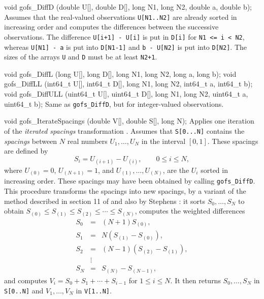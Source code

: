 void gofs_DiffD (double U[], double D[], long N1, long N2,
                 double a, double b);
\endcode
 \tab Assumes that the real-valued observations {\tt U[N1..N2]}
  are already sorted in increasing order and computes the differences
  between the successive observations.
  The difference {\tt U[i+1] - U[i]} is put in {\tt D[i]} for
  {\tt N1 <= i < N2}, whereas {\tt U[N1] - a} is put into {\tt D[N1-1]}
  and {\tt b - U[N2]} is put into {\tt D[N2]}.
  The sizes of the arrays {\tt U} and {\tt D} must be at least {\tt N2+1}.
 \endtab
\code


void gofs_DiffL (long U[], long D[], long N1, long N2, long a, long b);
void gofs_DiffLL (int64_t U[], int64_t D[], long N1, long N2,
                  int64_t a, int64_t b);
void gofs_DiffULL (uint64_t U[], uint64_t D[], long N1, long N2,
                   uint64_t a, uint64_t b);
\endcode
 \tab Same as {\tt gofs\_DiffD}, but for integer-valued observations.
 \endtab
\code


void gofs_IterateSpacings (double V[], double S[], long N);
\endcode
 \tab Applies one iteration of the {\em iterated spacings\/}
   transformation \cite{rKNU98a,tSTE86a}.
   Assumes that {\tt S[0...N]} contains the {\em spacings\/}
   between $N$ real numbers $U_1,\dots,U_N$ in the interval $[0,1]$.
   These spacings are defined by
    $$ S_i = U_{(i+1)} - U_{(i)},  \qquad  0\le i\le N, $$
   where $U_{(0)}=0$, $U_{(N+1)}=1$, and
   $U_{(1)},\dots,U_{(N)}$,  are the $U_i$ sorted in increasing order.
   These spacings may have been obtained by calling {\tt gofs\_DiffD}.
   This procedure transforms the spacings into new
   spacings, by a variant of the  method described
   in section 11 of \cite {rMAR85a} and also by Stephens \cite{tSTE86a}:
   it sorts $S_0,\dots,S_N$ to obtain
   $S_{(0)} \le S_{(1)} \le S_{(2)} \le \cdots \le S_{(N)}$,
   computes the weighted differences
  \begin {eqnarray*}
    S_{0}   &=& (N+1) S_{(0)}, \\
    S_{1}   &=& N (S_{(1)}-S_{(0)}), \\
    S_{2}   &=& (N-1) (S_{(2)}-S_{(1)}),\\
            & \vdots& \\
    S_{N}   &=& S_{(N)}-S_{(N-1)},
  \end {eqnarray*}
   and computes $V_i = S_0 + S_1 + \cdots + S_{i-1}$ for $1\le i\le N$.
   It then returns $S_0,\dots,S_N$ in {\tt S[0..N]} and
   $V_1,\dots,V_N$ in {\tt V[1..N]}.

